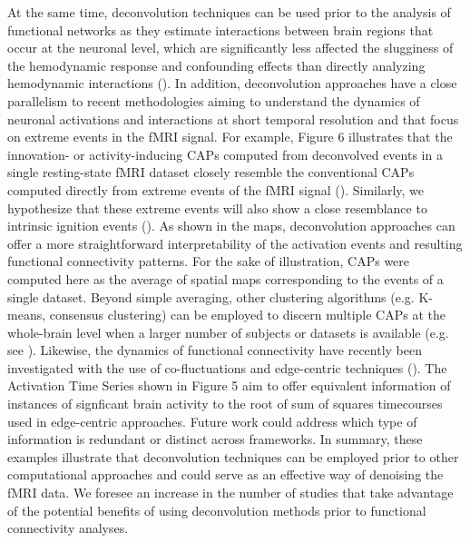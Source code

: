 At the same time, deconvolution techniques can be used prior to the analysis of functional networks as they estimate interactions between brain regions that occur at the neuronal level, which are significantly less affected the slugginess of the hemodynamic response and confounding effects than directly analyzing hemodynamic interactions (\citealt{Gitelman2003Modelingregionalpsychophysiologic}). In addition, deconvolution approaches have a close parallelism to recent methodologies aiming to understand the dynamics of neuronal activations and interactions at short temporal resolution and that focus on extreme events in the fMRI signal. For example, Figure 6 illustrates that the innovation- or activity-inducing CAPs computed from deconvolved events in a single resting-state fMRI dataset closely resemble the conventional CAPs computed directly from extreme events of the fMRI signal (\citealt{Liu2013Timevaryingfunctional,Liu2013Decompositionspontaneousbrain,Liu2018Coactivationpatterns,cifre2020revisiting,Cifre2020Furtherresultswhy,Zhang2020relationshipBOLDneural,Tagliazucchi2011,Tagliazucchi2012,Tagliazucchi2016,Rolls2021}). Similarly, we hypothesize that these extreme events will also show a close resemblance to intrinsic ignition events (\citealt{Deco2017a,Deco2017}). As shown in the maps, deconvolution approaches can offer a more straightforward interpretability of the activation events and resulting functional connectivity patterns. For the sake of illustration, CAPs were computed here as the average of spatial maps corresponding to the events of a single dataset. Beyond simple averaging, other clustering algorithms (e.g. K-means, consensus clustering) can be employed to discern multiple CAPs at the whole-brain level when a larger number of subjects or datasets is available (e.g. see \citealt{Karahanoglu2015Transientbrainactivity}). Likewise, the dynamics of functional connectivity have recently been investigated with the use of co-fluctuations and edge-centric techniques (\citealt{Faskowitz2020,Esfahlani2020Highamplitudecofluctuations,Jo2021,Sporns2021}). The Activation Time Series shown in Figure 5 aim to offer equivalent information of instances of signficant brain activity to the root of sum of squares timecourses used in edge-centric approaches. Future work could address which type of information is redundant or distinct across frameworks. In summary, these examples illustrate that deconvolution techniques can be employed prior to other computational approaches and could serve as an effective way of denoising the fMRI data. We foresee an increase in the number of studies that take advantage of the potential benefits of using deconvolution methods prior to functional connectivity analyses.

